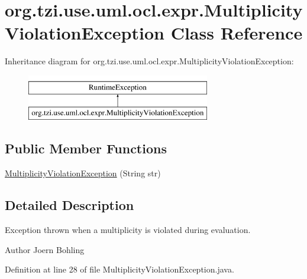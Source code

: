 \hypertarget{classorg_1_1tzi_1_1use_1_1uml_1_1ocl_1_1expr_1_1_multiplicity_violation_exception}{\section{org.\-tzi.\-use.\-uml.\-ocl.\-expr.\-Multiplicity\-Violation\-Exception Class Reference}
\label{classorg_1_1tzi_1_1use_1_1uml_1_1ocl_1_1expr_1_1_multiplicity_violation_exception}
}
Inheritance diagram for org.\-tzi.\-use.\-uml.\-ocl.\-expr.\-Multiplicity\-Violation\-Exception\-:\begin{figure}[H]
\begin{center}
\leavevmode
\includegraphics[height=2.000000cm]{classorg_1_1tzi_1_1use_1_1uml_1_1ocl_1_1expr_1_1_multiplicity_violation_exception}
\end{center}
\end{figure}
\subsection*{Public Member Functions}
\begin{DoxyCompactItemize}
\item 
\hyperlink{classorg_1_1tzi_1_1use_1_1uml_1_1ocl_1_1expr_1_1_multiplicity_violation_exception_a5a5c9fec39d79f9b825ac7342cfb202f}{Multiplicity\-Violation\-Exception} (String str)
\end{DoxyCompactItemize}


\subsection{Detailed Description}
Exception thrown when a multiplicity is violated during evaluation.

\begin{DoxyAuthor}{Author}
Joern Bohling 
\end{DoxyAuthor}


Definition at line 28 of file Multiplicity\-Violation\-Exception.\-java.



